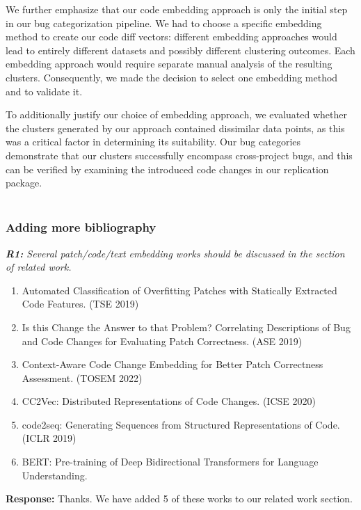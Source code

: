 \documentclass{article}
\begin{document}
We further emphasize that our code embedding approach is only the initial step in our bug categorization pipeline. We had to choose a specific embedding method to create our code diff vectors: different embedding approaches would lead to entirely different datasets and possibly different clustering outcomes. Each embedding approach would require separate manual analysis of the resulting clusters. Consequently, we made the decision to select one embedding method and to validate it.

To additionally justify our choice of embedding approach, we evaluated whether the clusters generated by our approach contained dissimilar data points, as this was a critical factor in determining its suitability. Our bug categories demonstrate that our clusters successfully encompass cross-project bugs, and this can be verified by examining the introduced code changes in our replication package. \\ \\

\subsubsection{\label{rev:1:bib}Adding more bibliography}

\textit{\textbf{R1:} Several patch/code/text embedding works should be discussed in the section of related work.}
\begin{enumerate}
    \item Automated Classification of Overfitting Patches with Statically Extracted Code Features. (TSE 2019)
    \item Is this Change the Answer to that Problem? Correlating Descriptions of Bug and Code Changes for Evaluating Patch Correctness. (ASE 2019)
    \item Context-Aware Code Change Embedding for Better Patch Correctness Assessment. (TOSEM 2022)
    \item CC2Vec: Distributed Representations of Code Changes. (ICSE 2020)
    \item code2seq: Generating Sequences from Structured Representations of Code. (ICLR 2019)
    \item BERT: Pre-training of Deep Bidirectional Transformers for Language Understanding.
\end{enumerate}


\vspace*{1em} \noindent \textbf{Response:} Thanks. We have added 5 of these works to our related work section.
\end{document}
